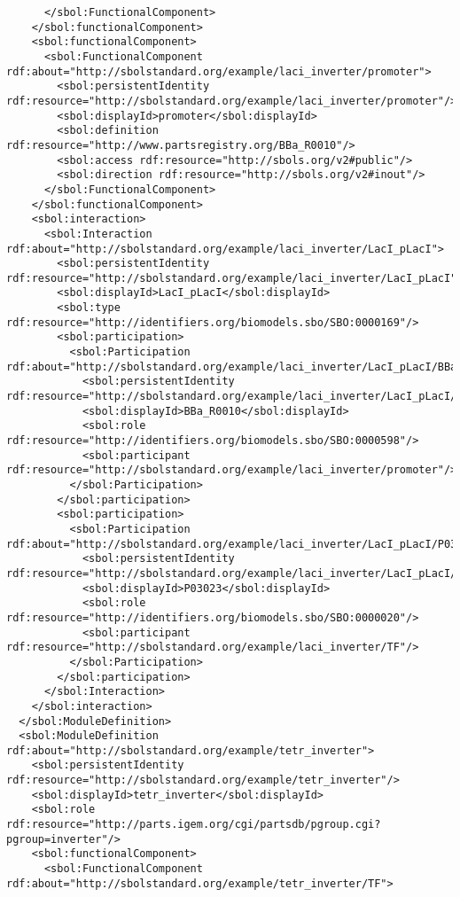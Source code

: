 \begin{lstlisting}
      </sbol:FunctionalComponent>
    </sbol:functionalComponent>
    <sbol:functionalComponent>
      <sbol:FunctionalComponent rdf:about="http://sbolstandard.org/example/laci_inverter/promoter">
        <sbol:persistentIdentity rdf:resource="http://sbolstandard.org/example/laci_inverter/promoter"/>
        <sbol:displayId>promoter</sbol:displayId>
        <sbol:definition rdf:resource="http://www.partsregistry.org/BBa_R0010"/>
        <sbol:access rdf:resource="http://sbols.org/v2#public"/>
        <sbol:direction rdf:resource="http://sbols.org/v2#inout"/>
      </sbol:FunctionalComponent>
    </sbol:functionalComponent>
    <sbol:interaction>
      <sbol:Interaction rdf:about="http://sbolstandard.org/example/laci_inverter/LacI_pLacI">
        <sbol:persistentIdentity rdf:resource="http://sbolstandard.org/example/laci_inverter/LacI_pLacI"/>
        <sbol:displayId>LacI_pLacI</sbol:displayId>
        <sbol:type rdf:resource="http://identifiers.org/biomodels.sbo/SBO:0000169"/>
        <sbol:participation>
          <sbol:Participation rdf:about="http://sbolstandard.org/example/laci_inverter/LacI_pLacI/BBa_R0010">
            <sbol:persistentIdentity rdf:resource="http://sbolstandard.org/example/laci_inverter/LacI_pLacI/BBa_R0010"/>
            <sbol:displayId>BBa_R0010</sbol:displayId>
            <sbol:role rdf:resource="http://identifiers.org/biomodels.sbo/SBO:0000598"/>
            <sbol:participant rdf:resource="http://sbolstandard.org/example/laci_inverter/promoter"/>
          </sbol:Participation>
        </sbol:participation>
        <sbol:participation>
          <sbol:Participation rdf:about="http://sbolstandard.org/example/laci_inverter/LacI_pLacI/P03023">
            <sbol:persistentIdentity rdf:resource="http://sbolstandard.org/example/laci_inverter/LacI_pLacI/P03023"/>
            <sbol:displayId>P03023</sbol:displayId>
            <sbol:role rdf:resource="http://identifiers.org/biomodels.sbo/SBO:0000020"/>
            <sbol:participant rdf:resource="http://sbolstandard.org/example/laci_inverter/TF"/>
          </sbol:Participation>
        </sbol:participation>
      </sbol:Interaction>
    </sbol:interaction>
  </sbol:ModuleDefinition>
  <sbol:ModuleDefinition rdf:about="http://sbolstandard.org/example/tetr_inverter">
    <sbol:persistentIdentity rdf:resource="http://sbolstandard.org/example/tetr_inverter"/>
    <sbol:displayId>tetr_inverter</sbol:displayId>
    <sbol:role rdf:resource="http://parts.igem.org/cgi/partsdb/pgroup.cgi?pgroup=inverter"/>
    <sbol:functionalComponent>
      <sbol:FunctionalComponent rdf:about="http://sbolstandard.org/example/tetr_inverter/TF">

\end{lstlisting}
